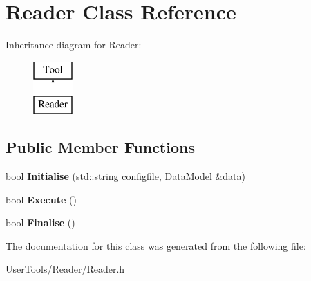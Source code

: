 \hypertarget{classReader}{\section{Reader Class Reference}
\label{classReader}
}
Inheritance diagram for Reader\-:\begin{figure}[H]
\begin{center}
\leavevmode
\includegraphics[height=2.000000cm]{classReader}
\end{center}
\end{figure}
\subsection*{Public Member Functions}
\begin{DoxyCompactItemize}
\item 
\hypertarget{classReader_a0411b8a792a72ef6f8e6bfae6f59c7c6}{bool {\bfseries Initialise} (std\-::string configfile, \hyperlink{classDataModel}{Data\-Model} \&data)}\label{classReader_a0411b8a792a72ef6f8e6bfae6f59c7c6}

\item 
\hypertarget{classReader_ac2d97e514bc663c57c9c5734e55b106e}{bool {\bfseries Execute} ()}\label{classReader_ac2d97e514bc663c57c9c5734e55b106e}

\item 
\hypertarget{classReader_a4aa801705707c799146cef9345de15fa}{bool {\bfseries Finalise} ()}\label{classReader_a4aa801705707c799146cef9345de15fa}

\end{DoxyCompactItemize}


The documentation for this class was generated from the following file\-:\begin{DoxyCompactItemize}
\item 
User\-Tools/\-Reader/Reader.\-h\end{DoxyCompactItemize}
